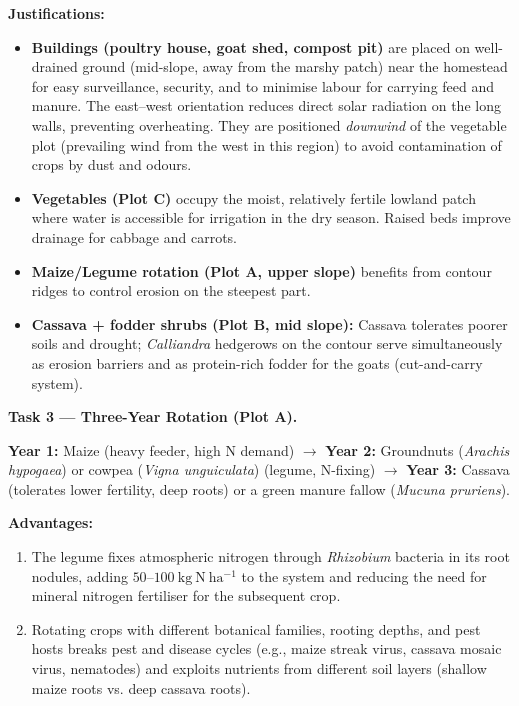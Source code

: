 \documentclass[11pt]{article}
\newcommand{\cle}[1]{{\popxbold\color{popdark}#1}}
\begin{document}
\textbf{Justifications:}
\begin{itemize}
\item \textbf{Buildings (poultry house, goat shed, compost pit)} are placed on well-drained ground (mid-slope, away from the marshy patch) near the homestead for easy surveillance, security, and to minimise labour for carrying feed and manure. The east--west orientation reduces direct solar radiation on the long walls, preventing overheating. They are positioned \emph{downwind} of the vegetable plot (prevailing wind from the west in this region) to avoid contamination of crops by dust and odours.
\item \textbf{Vegetables (Plot C)} occupy the moist, relatively fertile lowland patch where water is accessible for irrigation in the dry season. Raised beds improve drainage for cabbage and carrots.
\item \textbf{Maize/Legume rotation (Plot A, upper slope)} benefits from contour ridges to control erosion on the steepest part.
\item \textbf{Cassava + fodder shrubs (Plot B, mid slope):} Cassava tolerates poorer soils and drought; \emph{Calliandra} hedgerows on the contour serve simultaneously as \cle{erosion barriers} and as \cle{protein-rich fodder} for the goats (cut-and-carry system).
\end{itemize}

\textbf{Task 3 — Three-Year Rotation (Plot A).}\par
\textbf{Year 1:} Maize (heavy feeder, high N demand) $\rightarrow$ \textbf{Year 2:} Groundnuts (\emph{Arachis hypogaea}) or cowpea (\emph{Vigna unguiculata}) (legume, N-fixing) $\rightarrow$ \textbf{Year 3:} Cassava (tolerates lower fertility, deep roots) or a green manure fallow (\emph{Mucuna pruriens}).

\textbf{Advantages:}
\begin{enumerate}
\item The legume fixes atmospheric nitrogen through \emph{Rhizobium} bacteria in its root nodules, adding $50$--$100\ \mathrm{kg\ N\ ha^{-1}}$ to the system and reducing the need for mineral nitrogen fertiliser for the subsequent crop.
\item Rotating crops with different botanical families, rooting depths, and pest hosts breaks \cle{pest and disease cycles} (e.g., maize streak virus, cassava mosaic virus, nematodes) and exploits nutrients from different soil layers (shallow maize roots vs. deep cassava roots).
\end{enumerate}
\end{document}
